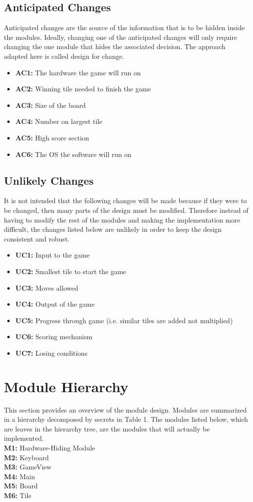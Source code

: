 \documentclass[12pt]{article}
\begin{document}
\subsection{Anticipated Changes}
Anticipated changes are the source of the information that is to be hidden inside the modules.
Ideally, changing one of the anticipated changes will only require changing the one module
that hides the associated decision. The approach adapted here is called design for change.
\begin{itemize}
\item \textbf{AC1:} The hardware the game will run on
\item \textbf{AC2:} Winning tile needed to finish the game
\item \textbf{AC3:} Size of the board
\item \textbf{AC4:} Number on largest tile
\item \textbf{AC5:} High score section
\item \textbf{AC6:} The OS the software will run on
\end{itemize}

\subsection{Unlikely Changes}
It is not intended that the following changes will be made because if they were to be changed, then many parts of the design must be modified. Therefore instead of having to modify the rest of the modules and making the implementation more difficult, the changes listed below are unlikely in order to keep the design consistent and robust. 
\begin{itemize}
\item \textbf{UC1:} Input to the game
\item \textbf{UC2:} Smallest tile to start the game
\item \textbf{UC3:} Moves allowed
\item \textbf{UC4:} Output of the game
\item \textbf{UC5:} Progress through game (i.e. similar tiles are added not multiplied)
\item \textbf{UC6:} Scoring mechanism
\item \textbf{UC7:}  Losing conditions 
\end{itemize} 

\section{Module Hierarchy}
This section provides an overview of the module design. Modules are summarized 
in a hierarchy decomposed by secrets in Table 1. The modules listed below, 
which are leaves in the hierarchy tree, are the modules that will actually be 
implemented.\bigskip\\
\textbf{M1:} Hardware-Hiding Module \\
\textbf{M2:} Keyboard \\
\textbf{M3:} GameView\\
\textbf{M4:} Main\\
\textbf{M5:} Board\\
\textbf{M6:} Tile\\
\end{document}
